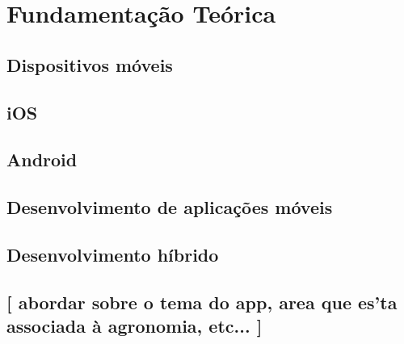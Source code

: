 \chapter{Fundamentação Teórica}

\section{Dispositivos móveis}
\lipsum[1-2]

\section{iOS}
\lipsum[1-2]


\section{Android}
\lipsum[1-2]


\section{Desenvolvimento de aplicações móveis}
\lipsum[1-2]


\section{Desenvolvimento híbrido}
\lipsum[1-2]


\section{[ abordar sobre o tema do app, area que es'ta associada à agronomia, etc... ]}
\lipsum[1-2]

